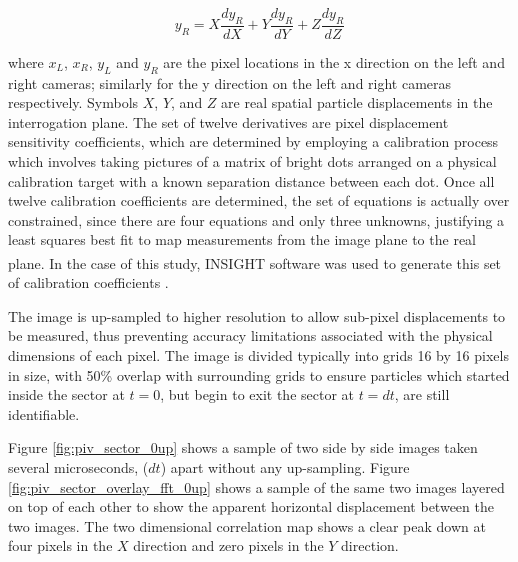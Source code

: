 \begin{equation}
y_R= X\frac{dy_R}{dX} + Y\frac{dy_R}{dY} + Z\frac{dy_R}{dZ}
\label{eq:piv_to_real4}
\end{equation}

\noindent
where $x_L$, $x_R$, $y_L$ and $y_R$ are the pixel locations in the x 
direction on the left and right cameras; similarly for the y direction on the 
left and 
right cameras respectively. Symbols $X$, $Y$, and $Z$ are real spatial particle 
displacements in the interrogation plane. The set of twelve derivatives are 
pixel displacement sensitivity coefficients, which are determined by employing 
a calibration process which involves taking pictures of a matrix of bright 
dots arranged on a physical calibration target with a known separation distance 
between 
each dot. Once all twelve calibration coefficients are determined, the set of 
equations is actually over constrained, since there are four equations and only 
three unknowns, justifying a least squares best fit to map measurements from 
the image plane to the real plane. In the case of this study, 
INSIGHT\textsuperscript{\textcopyright}  software was used to generate this 
set of calibration 
coefficients 
\cite{fouras2007}.

The image is 
up-sampled to higher resolution to allow sub-pixel displacements to be 
measured, thus preventing accuracy limitations associated with the physical 
dimensions of each pixel. The image is divided typically into grids 16 by 16 
pixels in size, with 50\% overlap with surrounding grids to ensure particles 
which started inside the sector at $t=0$, but begin to exit the sector at 
$t=dt$, are still identifiable.  


Figure \ref{fig:piv_sector_0up} shows a sample of two side by side images taken 
several microseconds, ($dt$) apart without any up-sampling. Figure 
\ref{fig:piv_sector_overlay_fft_0up} shows a sample of the same two images 
layered on top of each other to show the apparent horizontal displacement 
between the two images. The two dimensional correlation map shows a clear peak 
down at four pixels in the $X$ direction and zero pixels in the $Y$ direction.

